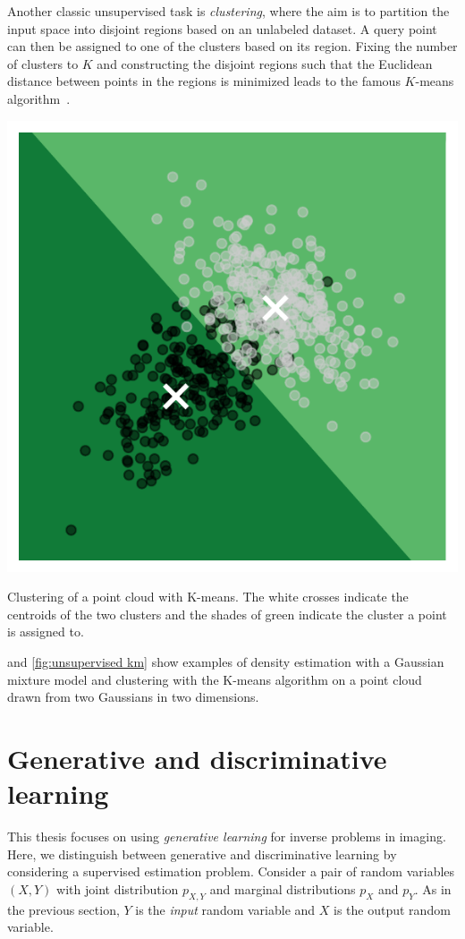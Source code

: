 Another classic unsupervised task is \emph{clustering}, where the aim is to partition the input space into disjoint regions based on an unlabeled dataset.
A query point can then be assigned to one of the clusters based on its region.
Fixing the number of clusters to \( K \) and constructing the disjoint regions such that the Euclidean distance between points in the regions is minimized leads to the famous \( K \)-means algorithm~\cite{lloyd_least_1982}.
\begin{sidefigure}
	\includegraphics[width=\marginparwidth]{learning-types/km}
	\caption[Unsupervised learning: Clustering]{
		Clustering of a point cloud with K-means.
		The white crosses indicate the centroids of the two clusters and the shades of green indicate the cluster a point is assigned to.
	}%
	\label{fig:unsupervised km}
\end{sidefigure}
 and \cref{fig:unsupervised km} show examples of density estimation with a Gaussian mixture model and clustering with the K-means algorithm on a point cloud drawn from two Gaussians in two dimensions.
\section{Generative and discriminative learning}
This thesis focuses on using \emph{generative learning} for inverse problems in imaging.
Here, we distinguish between generative and discriminative learning by considering a supervised estimation problem.
Consider a pair of random variables \( (X, Y) \) with joint distribution \( p_{X, Y } \) and marginal distributions \( p_X \) and \( p_Y \).
As in the previous section, \( Y \) is the \emph{input} random variable and \( X \) is the output random variable.

